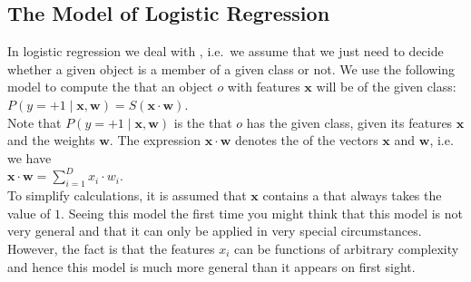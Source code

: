 \subsection{The Model of Logistic Regression}
In logistic regression we deal with , 
i.e.~we assume that we just need to decide
whether a given object is a member of a given class or not.  We use the following model to compute the  that an
object $o$ with features $\mathbf{x}$ will be of the given class: 
\\[0.2cm]
\hspace*{1.3cm}
$P(y=+1\;|\;\mathbf{x},\mathbf{w}) = S(\mathbf{x} \cdot \mathbf{w})$.
\\[0.2cm]
Note that $P(y=+1\;|\;\mathbf{x},\mathbf{w})$ is the  that $o$ has the given
class, given its features $\mathbf{x}$ and the weights $\mathbf{w}$.  The expression $\mathbf{x}
\cdot \mathbf{w}$ denotes the  of the vectors $\mathbf{x}$ and $\mathbf{w}$,  
i.e. we have
\\[0.2cm]
\hspace*{1.3cm}
$\mathbf{x} \cdot \mathbf{w} = \sum\limits_{i=1}^D x_i \cdot w_i$.
\\[0.2cm] 
To simplify calculations, it is assumed that $\mathbf{x}$ contains a  that always takes the value of $1$.
Seeing this model the first time you might think that this model is not very general and that it can only be
applied in very special circumstances.  However, the fact is that the features $x_i$ can be functions of arbitrary complexity
and hence this model is much more general than it appears on first sight.

